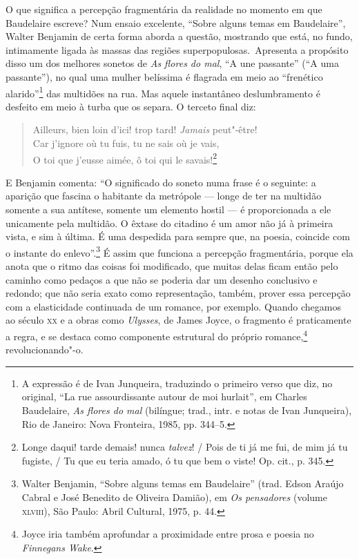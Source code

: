 O que significa a percepção fragmentária da realidade no momento em que
Baudelaire escreve? Num ensaio excelente, “Sobre alguns temas em
Baudelaire”, Walter Benjamin de certa forma aborda a questão, mostrando
que está, no fundo, intimamente ligada às massas das regiões
superpopulosas.~Apresenta a propósito disso um dos melhores sonetos de
\textit{As flores do mal}, “A une passante” (“A uma passante”), no qual uma
 mulher belíssima é flagrada em meio ao “frenético alarido”\footnote{ A
expressão é de Ivan Junqueira, traduzindo o primeiro verso que diz, no
original, “La rue assourdissante autour de moi hurlait”, em
Charles Baudelaire, \textit{As flores do mal} (bilíngue; trad.,
intr. e notas de Ivan Junqueira), Rio de Janeiro: Nova Fronteira,
1985, pp. 344--5.} das multidões na rua. Mas aquele instantâneo
deslumbramento é desfeito em meio à turba que os separa. O terceto
final diz:


\begin{quote}
Ailleurs, bien loin d’ici! trop tard! \textit{Jamais} peut"-être!\\ 
Car j’ignore où tu fuis, tu ne sais où je vais,\\
O toi que j’eusse aimée, ô toi qui le savais!\footnote{
Longe daqui! tarde demais! nunca \textit{talvez}! /
Pois de ti já me fui, de mim já tu fugiste, /
Tu que eu teria amado, ó tu que bem o viste! Op. cit.,
p. 345.}
\end{quote}

E Benjamin comenta: “O significado do soneto numa frase é o seguinte: a
aparição que fascina o habitante da metrópole --- longe de ter na
multidão somente a sua antítese, somente um elemento hostil --- é
proporcionada a ele unicamente pela multidão. O êxtase do citadino é um
amor não já à primeira vista, e sim à última. É uma despedida para
sempre que, na poesia, coincide com o instante do enlevo”.\footnote{
 Walter Benjamin, “Sobre alguns temas em Baudelaire” (trad. Edson
Araújo Cabral e José Benedito de Oliveira Damião), em \textit{Os pensadores}
(volume \textsc{xlviii}), São Paulo: Abril Cultural, 1975, p. 44.} É assim que
funciona a percepção fragmentária, porque ela anota que o ritmo das
coisas foi modificado, que muitas delas ficam então pelo caminho como
pedaços a que não se poderia dar um desenho conclusivo e redondo; que
não seria exato como representação, também, prover essa percepção com a
elasticidade continuada de um romance, por exemplo. Quando chegamos ao
século \textsc{xx} e a obras como \textit{Ulysses}, de James Joyce, o fragmento
é praticamente a regra, e se destaca como componente estrutural do
próprio romance,\footnote{ Joyce iria também aprofundar a proximidade
entre prosa e poesia no \textit{Finnegans Wake}.} revolucionando"-o.

